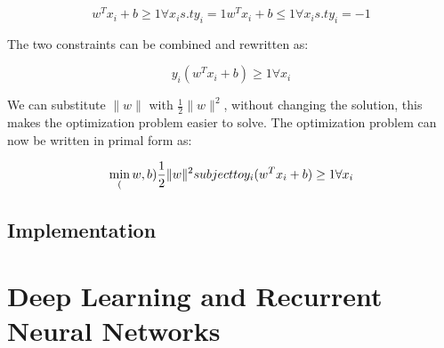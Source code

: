 \begin{equation}
{w^T}x_i + b \geq 1 \forall x_i s.t y_i = 1
{w^T}x_i + b \leq 1 \forall x_i s.t y_i = -1
\end{equation}

The two constraints can be combined and rewritten as:

\begin{equation}
y_i(w^{T}x_i + b) \geq 1 \forall x_i
\end{equation}

We can substitute $\|w\|$ with $\frac{1}{2}\|w\|^2$, without changing the solution, this makes the optimization problem easier to solve. The optimization problem can now be written in primal form as:

\begin{equation}
\operatornamewithlimits{min}_(w, b)\frac{1}{2} \|w\|^2 \\
subject to y_i(w^{T}x_i + b) \geq 1 \forall x_i
\end{equation}

\subsection{Implementation}

\section{Deep Learning and Recurrent Neural Networks}
\label{sec:deep}